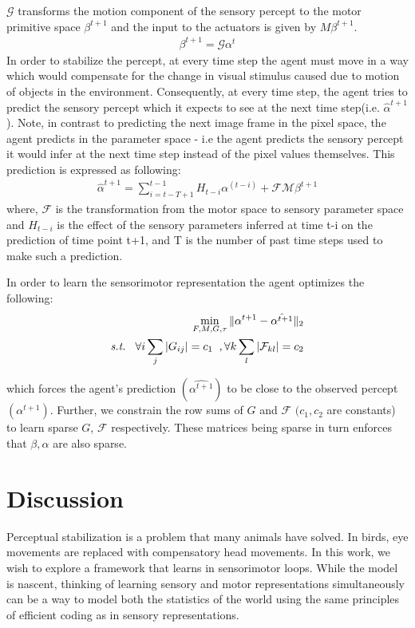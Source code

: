 \documentclass[conference]{IEEEtran}
\begin{document}
$\mathcal{G}$ transforms the motion component of the sensory percept to the motor primitive space $\beta^{t+1}$ and the input to the actuators is given by $M\beta^{t+1}$.
\begin{eqnarray}
\beta^{t+1} = \mathcal{G} \alpha^{t}
\end{eqnarray}
In order to stabilize the percept, at every time step the agent must move in a way which would compensate for the change in visual stimulus caused due to motion of objects in the environment. Consequently, at every time step, the agent tries to predict the sensory percept which it expects to see at the next time step(i.e. $\hat{\alpha}^{t+1}$). Note, in contrast to predicting the next image frame in the pixel space, the agent predicts in the parameter space - i.e the agent predicts the sensory percept it would infer at the next time step instead of the pixel values themselves. This prediction is expressed as following:
\begin{eqnarray}
\hat{\alpha}^{t+1} = \sum_{i=t-T+1}^{t-1}  H_{t-i} \alpha^{(t-i)} + \mathcal{F}\mathcal{M}\beta^{t+1} 
\end{eqnarray}
where, $\mathcal{F}$ is the transformation from the motor space to sensory parameter space and $H_{t-i}$ is the effect of the sensory parameters inferred at time t-i on the prediction of time point t+1, and T is the number of past time steps used to make such a prediction. 

In order to learn the sensorimotor representation the agent optimizes the following:
\begin{eqnarray}
\min_{F,M,G,\tau} \| \alpha^{t+1} - \hat{\alpha^{t+1}} \|_{2} \\
\nonumber \textit{s.t.} \hspace{3mm} \forall i \sum_{j}  |G_{ij}| = c_1  \hspace{2mm}, \forall k \sum_{l}  |\mathcal{F}_{kl}| = c_2 
\end{eqnarray}

which forces the agent's prediction $(\hat{\alpha^{t+1}})$ to be close to the observed percept$({\alpha^{t+1}})$. Further, we constrain the row sums of $G$ and $\mathcal{F}$ $(c_1, c_2 $ are constants) to learn sparse $G$, $\mathcal{F}$ respectively. These matrices being sparse in turn enforces that $\beta,\hat{\alpha} $ are also sparse.

\section{Discussion}
Perceptual stabilization is a problem that many animals have solved. In birds, eye movements are replaced with compensatory head movements. In this work, we wish to explore a framework that learns in sensorimotor loops. While the model is nascent, thinking of learning sensory and motor representations simultaneously can be a way to model both the statistics of the world using the same principles of efficient coding as in sensory representations.
\end{document}
